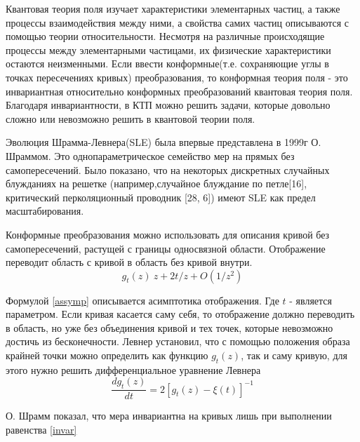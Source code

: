 \documentclass[12pt,a4paper]{article}
\begin{document}
	\par Квантовая теория поля изучает характеристики элементарных частиц, а также процессы взаимодействия между ними, а свойства самих частиц описываются с помощью теории относительности. Несмотря на различные происходящие процессы между элементарными частицами, их физические характеристики остаются неизменными. Если ввести конформные(т.е. сохраняющие углы в точках пересечениях кривых) преобразования, то конформная теория поля - это инвариантная относительно конформных преобразований квантовая теория поля. Благодаря инвариантности, в КТП можно решить задачи, которые довольно сложно или невозможно решить в квантовой теории поля.
	
	\par Эволюция Шрамма-Левнера(SLE)  была впервые представлена в 1999г О. Шраммом. Это однопараметрическое семейство мер на прямых без самопересечений. Было показано, что на некоторых дискретных случайных блужданиях на решетке (например,случайное блуждание по петле[16], критический перколяционный проводник [28, 6]) имеют SLE как предел масштабирования. 
	\par Конформные преобразования можно использовать для описания кривой без самопересечений, растущей с границы односвязной области. Отображение переводит область с кривой в область без кривой внутри.
	\begin{equation}\label{assymp}
		g_{t}(z) ~ z + 2t/z + O(1/z^{2})
	\end{equation}
	
	\par Формулой \ref{assymp} описывается асимптотика отображения. Где $t$ - является параметром. Если кривая касается саму себя, то отображение должно переводить в область, но уже без объединения кривой и тех точек, которые невозможно достичь из бесконечности. Левнер установил, что с помощью положения образа крайней точки можно определить как функцию $g_{t}(z)$, так и саму кривую, для этого нужно решить дифференциальное уравнение Левнера 
	\begin{equation}\label{sle_eq}
		\dfrac{dg_{t}(z)}{dt} = 2[g_{t}(z)-\xi(t)]^{-1}
	\end{equation}
	\par О. Шрамм показал, что мера инвариантна на кривых лишь при выполнении равенства \ref{invar}
	
\end{document}
